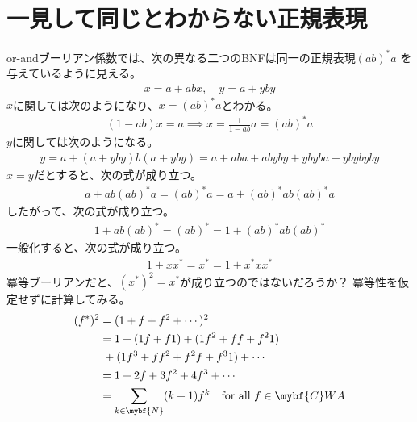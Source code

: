 \section{一見して同じとわからない正規表現}\label{s1:一見して同じとわからない正規表現} %
	or-andブーリアン係数では、次の異なる二つのBNFは同一の正規表現$(ab)^*a$
	を与えているように見える。
	\begin{equation*}\begin{split} %
		x = a + abx,\quad y = a + yby
	\end{split}\end{equation*} %
	$x$に関しては次のようになり、$x=(ab)^*a$とわかる。
	\begin{equation*}\begin{split} %
		(1-ab)x=a \implies x = \frac{1}{1-ab}a = (ab)^*a
	\end{split}\end{equation*} %
	$y$に関しては次のようになる。
	\begin{equation*}\begin{split} %
		y=a+(a+yby)b(a+yby)=a+aba+abyby+ybyba+ybybyby
	\end{split}\end{equation*} %
	$x=y$だとすると、次の式が成り立つ。
	\begin{equation*}\begin{split} %
		a+ab(ab)^*a = (ab)^*a = a+(ab)^*ab(ab)^*a
	\end{split}\end{equation*} %
	したがって、次の式が成り立つ。
	\begin{equation*}\begin{split} %
		1+ab(ab)^* = (ab)^* = 1+(ab)^*ab(ab)^*
	\end{split}\end{equation*} %
	一般化すると、次の式が成り立つ。
	\begin{equation*}\begin{split} %
		1+xx^* = x^* = 1+x^*xx^*
	\end{split}\end{equation*} %
	冪等ブーリアンだと、$(x^*)^2=x^*$が成り立つのではないだろうか？
	冪等性を仮定せずに計算してみる。
	\begin{equation}\label{eq:ハミルトニアンに相似な式}\begin{split} %
		(f^*)^2 &= (1+ f + f^2 + \cdots)^2 \\
		&= 1 + (1f+f1) + (1f^2+ff+f^21) \\
		&\;+ (1f^3+ff^2+f^2f+f^31) + \cdots \\
		&= 1 + 2f + 3f^2 + 4f^3 + \cdots \\
		&= \sum_{k\in\mybf{N}}(k+1)f^k \quad\text{for all }f\in \mybf{C}WA
	\end{split}\end{equation} %

